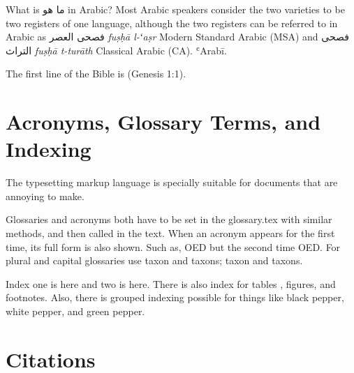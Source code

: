 What is ما هو in Arabic?
\medskip
\textnormal
\noindent Most Arabic speakers consider the two varieties to be two registers
of one language, although the two registers can be referred to in
Arabic as فصحى العصر \textit{fuṣḥā l-ʻaṣr} Modern Standard Arabic (MSA) and
فصحى التراث \textit{fuṣḥā t-turāth} Classical Arabic (CA). ʿArab\={i}.

\medskip

The first line of the Bible is  (Genesis 1:1).



\section{Acronyms, Glossary Terms, and Indexing}

The  typesetting markup language is specially suitable for documents that are annoying to make.

\bigskip

Glossaries and acronyms both have to be set in the glossary.tex with similar methods, and then called in the text. When an acronym appears for the first time, its full form is also shown. Such as, \gls{OED} but the second time \gls{OED}. For plural and capital glossaries use \gls{taxon} and \glspl{taxon}; \Gls{taxon} and \Glspl{taxon}.

Index one is here and  two is here. There is also index for tables , figures, and footnotes.
Also, there is grouped indexing possible for things like black pepper, white pepper, and green pepper. 


\section{Citations}

